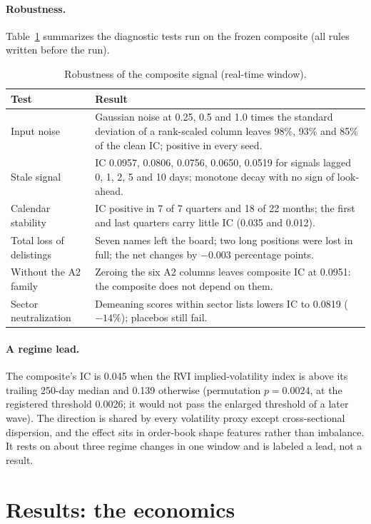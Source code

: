 \documentclass[11pt]{article}
\begin{document}
\paragraph{Robustness.} Table~\ref{tab:robust} summarizes the diagnostic tests run on the frozen composite (all rules written before the run).
\begin{table}[ht]
\centering
\caption{Robustness of the composite signal (real-time window).}
\label{tab:robust}
\begin{tabular}{p{4.2cm}p{9.2cm}}
\toprule
Test & Result \\
\midrule
Input noise & Gaussian noise at 0.25, 0.5 and 1.0 times the standard deviation of a rank-scaled column leaves 98\%, 93\% and 85\% of the clean IC; positive in every seed. \\
Stale signal & IC 0.0957, 0.0806, 0.0756, 0.0650, 0.0519 for signals lagged 0, 1, 2, 5 and 10 days; monotone decay with no sign of look-ahead. \\
Calendar stability & IC positive in 7 of 7 quarters and 18 of 22 months; the first and last quarters carry little IC (0.035 and 0.012). \\
Total loss of delistings & Seven names left the board; two long positions were lost in full; the net changes by $-0.003$ percentage points. \\
Without the A2 family & Zeroing the six A2 columns leaves composite IC at 0.0951: the composite does not depend on them. \\
Sector neutralization & Demeaning scores within sector lists lowers IC to 0.0819 ($-14\%$); placebos still fail. \\
\bottomrule
\end{tabular}
\end{table}

\paragraph{A regime lead.} The composite's IC is 0.045 when the RVI implied-volatility index is above its trailing 250-day median and 0.139 otherwise (permutation $p=0.0024$, at the registered threshold 0.0026; it would not pass the enlarged threshold of a later wave). The direction is shared by every volatility proxy except cross-sectional dispersion, and the effect sits in order-book shape features rather than imbalance. It rests on about three regime changes in one window and is labeled a lead, not a result.

\section{Results: the economics}\label{sec:econ}
\end{document}
